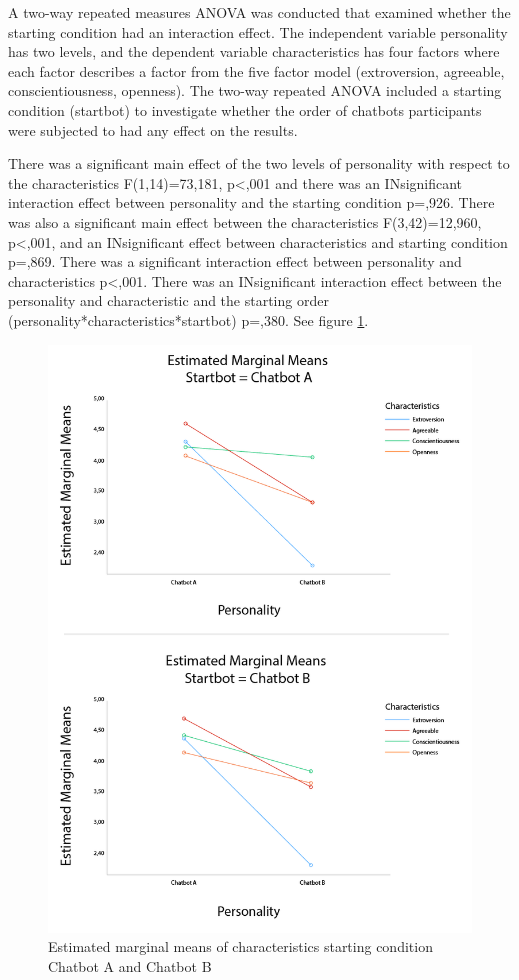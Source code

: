 A two-way repeated measures ANOVA was conducted that examined whether the starting condition had an interaction effect. The independent variable personality has two levels, and the dependent variable characteristics has four factors where each factor describes a factor from the five factor model (extroversion, agreeable, conscientiousness, openness). The two-way repeated ANOVA included a starting condition (startbot) to investigate whether the order of chatbots participants were subjected to had any effect on the results.

There was a significant main effect of the two levels of personality with respect to the characteristics F(1,14)=73,181, p<,001 and there was an INsignificant interaction effect between personality and the starting condition p=,926. There was also a significant main effect between the characteristics F(3,42)=12,960, p<,001, and an INsignificant effect between characteristics and starting condition p=,869. There was a significant interaction effect between personality and characteristics p<,001. There was an INsignificant interaction effect between the personality and characteristic and the starting order (personality*characteristics*startbot) p=,380. See figure \ref{fig:characstartAB}.

\begin{figure}[h]
    \centering
    \includegraphics[scale=0.4]{figures/MMeanStartbotABCharacteristics.png}
    \caption{Estimated marginal means of characteristics starting condition Chatbot A and Chatbot B}
    \label{fig:characstartAB}
\end{figure}

